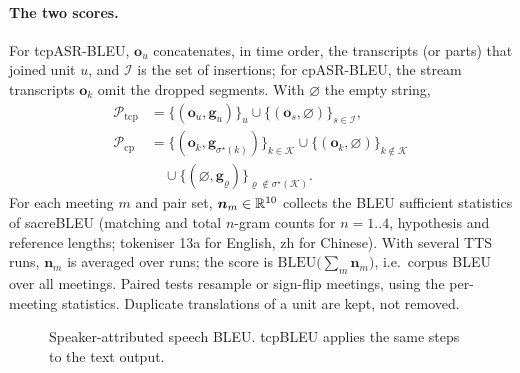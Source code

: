 \paragraph{The two scores.} For tcpASR-BLEU, $\bm{o}_u$ concatenates, in time order, the transcripts (or parts) that joined
unit $u$, and $\mathcal{I}$ is the set of insertions; for cpASR-BLEU, the stream transcripts $\bm{o}_k$ omit the dropped
segments. With $\varnothing$ the empty string,
\begin{equation}
\begin{aligned}
\mathcal{P}_{\mathrm{tcp}}&=\{(\bm{o}_u,\bm{g}_u)\}_{u}\cup\{(\bm{o}_s,\varnothing)\}_{s\in\mathcal{I}},\\
\mathcal{P}_{\mathrm{cp}}&=\{(\bm{o}_k,\bm{g}_{\sigma^\star(k)})\}_{k\in\mathcal{K}}\cup\{(\bm{o}_k,\varnothing)\}_{k\notin\mathcal{K}}\\
&\quad\cup\{(\varnothing,\bm{g}_\varrho)\}_{\varrho\notin\sigma^\star(\mathcal{K})}.
\end{aligned}
\label{eq:pairs}
\end{equation}
For each meeting $m$ and pair set, $\bm{n}_m\in\mathbb{R}^{10}$ collects the BLEU sufficient statistics of sacreBLEU (matching
and total $n$-gram counts for $n=1..4$, hypothesis and reference lengths; tokeniser 13a for English, zh for Chinese).
With several TTS runs, $\bm{n}_m$ is averaged over runs; the score is $\mathrm{BLEU}\big(\sum_m\bm{n}_m\big)$, i.e.\ corpus
BLEU over all meetings. Paired tests resample or sign-flip meetings, using the per-meeting statistics. Duplicate
translations of a unit are kept, not removed.

\begin{figure}[!htbp]
\small
{}
\caption{Speaker-attributed speech BLEU. tcpBLEU applies the same steps to the text output.}
\label{alg:metrics}
\end{figure}

